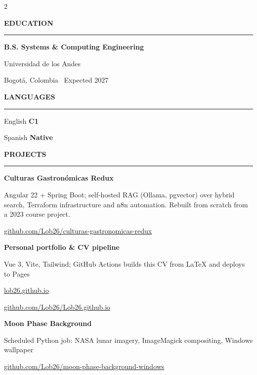 \documentclass[10pt,a4paper]{article}
\newcommand{\cvsection}[1]{%
  \needspace{3\baselineskip}%
  \par\vspace{2.2ex}%
  {\color{ink}\large\bfseries\MakeUppercase{#1}}\par
  \vspace{0.4ex}%
  {\color{navy}\rule{\linewidth}{0.9pt}}\par
  \vspace{0.9ex}}
\begin{document}
\begin{paracol}{2}
\cvsection{Education}
{\color{ink}\bfseries\small B.S. Systems \& Computing Engineering}\par
\vspace{0.2ex}
{\color{navy}\small Universidad de los Andes}\par
{\color{softgray}\small Bogotá, Colombia \textbar\ Expected 2027}\par

\cvsection{Languages}
{\color{ink}\small English} \hfill {\color{navy}\small\bfseries C1}\par
\vspace{0.4ex}
{\color{ink}\small Spanish} \hfill {\color{navy}\small\bfseries Native}\par

\cvsection{Projects}
{\color{ink}\small\bfseries Culturas Gastronómicas Redux}\par
{\color{softgray}\footnotesize Angular 22 + Spring Boot; self-hosted RAG (Ollama, pgvector) over hybrid search, Terraform infrastructure and n8n automation. Rebuilt from scratch from a 2023 course project.}\par
{\color{softgray}\footnotesize\href{https://github.com/Lob26/culturas-gastronomicas-redux}{github.com/Lob26/culturas-gastronomicas-redux}}\par
\vspace{0.6ex}
{\color{ink}\small\bfseries Personal portfolio \& CV pipeline}\par
{\color{softgray}\footnotesize Vue 3, Vite, Tailwind; GitHub Actions builds this CV from LaTeX and deploys to Pages}\par
{\color{softgray}\footnotesize\href{https://lob26.github.io}{lob26.github.io}}\par
{\color{softgray}\footnotesize\href{https://github.com/Lob26/Lob26.github.io}{github.com/Lob26/Lob26.github.io}}\par
\vspace{0.6ex}
{\color{ink}\small\bfseries Moon Phase Background}\par
{\color{softgray}\footnotesize Scheduled Python job: NASA lunar imagery, ImageMagick compositing, Windows wallpaper}\par
{\color{softgray}\footnotesize\href{https://github.com/Lob26/moon-phase-background-windows}{github.com/Lob26/moon-phase-background-windows}}\par

\end{paracol}
\end{document}
